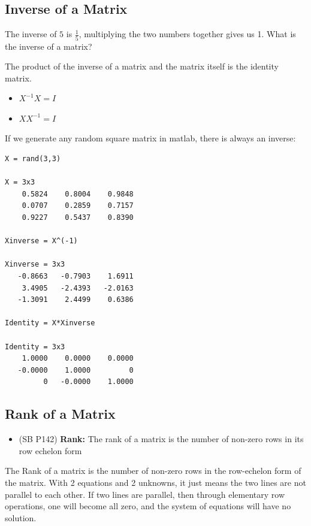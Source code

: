 \documentclass[
]{book}
\providecommand{\tightlist}{%
  \setlength{\itemsep}{0pt}\setlength{\parskip}{0pt}}
\begin{document}
\hypertarget{inverse-of-a-matrix}{%
\subsection{Inverse of a Matrix}\label{inverse-of-a-matrix}}

The inverse of \(5\) is \(\frac{1}{5}\), multiplying the two numbers
together gives us 1. What is the inverse of a matrix?

The product of the inverse of a matrix and the matrix itself is the
identity matrix.

\begin{itemize}
\item
  \(\displaystyle X^{-1} X=I\)
\item
  \(\displaystyle XX^{-1} =I\)
\end{itemize}

If we generate any random square matrix in matlab, there is always an
inverse:

\begin{verbatim}
X = rand(3,3)

X = 3x3    
    0.5824    0.8004    0.9848
    0.0707    0.2859    0.7157
    0.9227    0.5437    0.8390

Xinverse = X^(-1)

Xinverse = 3x3    
   -0.8663   -0.7903    1.6911
    3.4905   -2.4393   -2.0163
   -1.3091    2.4499    0.6386

Identity = X*Xinverse

Identity = 3x3    
    1.0000    0.0000    0.0000
   -0.0000    1.0000         0
         0   -0.0000    1.0000
\end{verbatim}

\hypertarget{rank-of-a-matrix}{%
\subsection{Rank of a Matrix}\label{rank-of-a-matrix}}

\begin{itemize}
\tightlist
\item
  (SB P142) \textbf{Rank:} The rank of a matrix is the number of non-zero
  rows in its row echelon form
\end{itemize}

The Rank of a matrix is the number of non-zero rows in the row-echelon
form of the matrix. With 2 equations and 2 unknowns, it just means the
two lines are not parallel to each other. If two lines are parallel,
then through elementary row operations, one will become all zero, and
the system of equations will have no solution.
\end{document}
